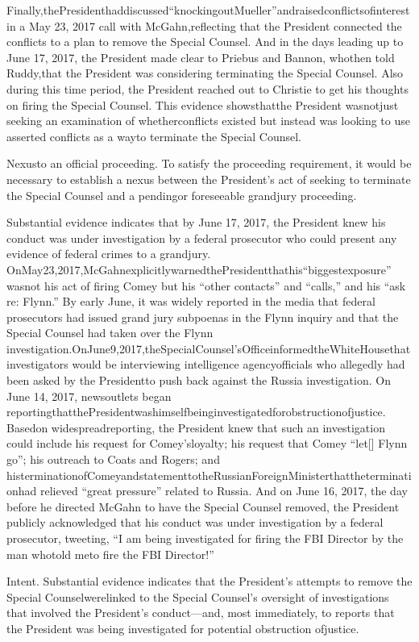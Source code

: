 {Finally,thePresidenthaddiscussed“knockingoutMueller”andraisedconflictsofinterest in a May 23, 2017 call with McGahn,reflecting that the President connected the conflicts to a plan to remove the Special Counsel.
And in the days leading up to June 17, 2017, the President made clear to Priebus and Bannon, whothen told Ruddy,that the President was considering terminating the Special Counsel.
Also during this time period, the President reached out to Christie to get his thoughts on firing the Special Counsel.
This evidence showsthatthe President wasnotjust seeking an examination of whetherconflicts existed but instead was looking to use asserted conflicts as a wayto terminate the Special Counsel.

Nexusto an official proceeding.
To satisfy the proceeding requirement, it would be necessary to establish a nexus between the President’s act of seeking to terminate the Special Counsel and a pendingor foreseeable grandjury proceeding.

Substantial evidence indicates that by June 17, 2017, the President knew his conduct was under investigation by a federal prosecutor who could present any evidence of federal crimes to a grandjury.
OnMay23,2017,McGahnexplicitlywarnedthePresidentthathis“biggestexposure” wasnot his act of firing Comey but his “other contacts” and “calls,” and his “ask re: Flynn.”
By early June, it was widely reported in the media that federal prosecutors had issued grand jury subpoenas in the Flynn inquiry and that the Special Counsel had taken over the Flynn investigation.OnJune9,2017,theSpecialCounsel’sOfficeinformedtheWhiteHousethat investigators would be interviewing intelligence agencyofficials who allegedly had been asked by the Presidentto push back against the Russia investigation.
On June 14, 2017, newsoutlets began reportingthatthePresidentwashimselfbeinginvestigatedforobstructionofjustice.
Basedon widespreadreporting, the President knew that such an investigation could include his request for Comey’sloyalty; his request that Comey “let[] Flynn go”; his outreach to Coats and Rogers; and histerminationofComeyandstatementtotheRussianForeignMinisterthattheterminationhad relieved “great pressure” related to Russia.
And on June 16, 2017, the day before he directed McGahn to have the Special Counsel removed, the President publicly acknowledged that his conduct was under investigation by a federal prosecutor, tweeting, “I am being investigated for firing the FBI Director by the man whotold meto fire the FBI Director!”

Intent.
Substantial evidence indicates that the President’s attempts to remove the Special Counselwerelinked to the Special Counsel’s oversight of investigations that involved the President’s conduct—and, most immediately, to reports that the President was being investigated for potential obstruction ofjustice.

}

